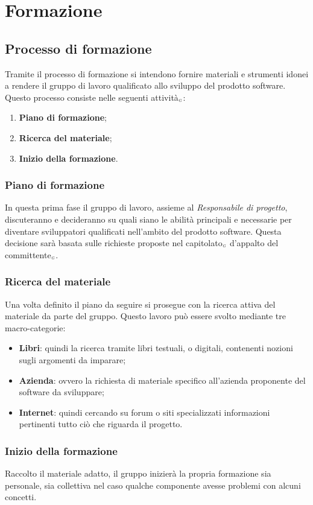 \chapter{Formazione}\label{Formazione}
\section{Processo di formazione}\label{FormazioneProcessoDiFormazione}
Tramite il processo di formazione si intendono fornire materiali e strumenti idonei a rendere il gruppo di lavoro qualificato allo sviluppo del prodotto software.
Questo processo consiste nelle seguenti attività$_{\scaleto{G}{3pt}}$:
\begin{enumerate}
	\item \textbf{Piano di formazione};
	\item \textbf{Ricerca del materiale};
	\item \textbf{Inizio della formazione}.
\end{enumerate}
\subsection{Piano di formazione}\label{FormazioneProcessoDiFormazionePianoDiFormazione}
In questa prima fase il gruppo di lavoro, assieme al \textit{Responsabile di progetto}, discuteranno e decideranno su quali siano le abilità principali e necessarie per diventare sviluppatori qualificati nell'ambito del prodotto software.
Questa decisione sarà basata sulle richieste proposte nel capitolato$_{\scaleto{G}{3pt}}$ d'appalto del committente$_{\scaleto{G}{3pt}}$.
\subsection{Ricerca del materiale}\label{FormazioneProcessoDiFormazioneRicercaDelMateriale}
Una volta definito il piano da seguire si prosegue con la ricerca attiva del materiale da parte del gruppo.
Questo lavoro può essere svolto mediante tre macro-categorie:
\begin{itemize}
	\item \textbf{Libri}: quindi la ricerca tramite libri testuali, o digitali, contenenti nozioni sugli argomenti da imparare;
	\item \textbf{Azienda}: ovvero la richiesta di materiale specifico all'azienda proponente del software da sviluppare;
	\item \textbf{Internet}: quindi cercando su forum o siti specializzati informazioni pertinenti tutto ciò che riguarda il progetto.
\end{itemize}
\subsection{Inizio della formazione}\label{FormazioneProcessoDiFormazioneInizioDellaFormazione}
Raccolto il materiale adatto, il gruppo inizierà la propria formazione sia personale, sia collettiva nel caso qualche componente avesse problemi con alcuni concetti.
